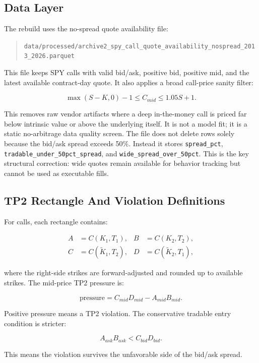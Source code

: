 \documentclass[11pt]{article}
\begin{document}
\subsection{Data Layer}

The rebuild uses the no-spread quote availability file:

\begin{quote}\small
\texttt{data/processed/archive2\_spy\_call\_quote\_availability\_nospread\_2013\_2026.parquet}
\end{quote}

This file keeps SPY calls with valid bid/ask, positive bid, positive mid, and the latest available
contract-day quote. It also applies a broad call-price sanity filter:

\[
\max(S-K,0)-1 \le C_{mid} \le 1.05S+1.
\]

This removes raw vendor artifacts where a deep in-the-money call is priced far below intrinsic
value or above the underlying itself. It is not a model fit; it is a static no-arbitrage data
quality screen. The file does not delete rows solely because the bid/ask spread exceeds 50\%.
Instead it stores \texttt{spread\_pct}, \texttt{tradable\_under\_50pct\_spread}, and
\texttt{wide\_spread\_over\_50pct}. This is the key structural correction: wide quotes remain
available for behavior tracking but cannot be used as executable fills.

\subsection{TP2 Rectangle And Violation Definitions}

For calls, each rectangle contains:

\begin{align*}
A &= C(K_1,T_1), & B &= C(K_2,T_2),\\
C &= C(\tilde K_1,T_2), & D &= C(\tilde K_2,T_1),
\end{align*}

where the right-side strikes are forward-adjusted and rounded up to available strikes. The
mid-price TP2 pressure is:

\[
\text{pressure} = C_{mid}D_{mid} - A_{mid}B_{mid}.
\]

Positive pressure means a TP2 violation. The conservative tradable entry condition is stricter:

\[
A_{ask}B_{ask} < C_{bid}D_{bid}.
\]

This means the violation survives the unfavorable side of the bid/ask spread.
\end{document}
